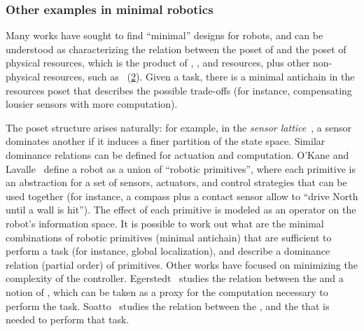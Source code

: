 \begin{figure}[h]
    \centering
    \caption{}
    \label{fig:dp_zia}
\end{figure}

\subsubsection{Other examples in minimal robotics}

Many works have sought to find ``minimal'' designs for robots, and can be understood as characterizing the relation between the poset of  and the poset of physical resources, which is the product of , , and  resources, plus other non-physical resources, such as ~(\cref{fig:robot-generic}).
Given a task, there is a minimal antichain in the resources poset that describes the possible trade-offs (for instance, compensating lousier sensors with more computation).



\begin{figure}
    \centering
    \caption{}
    \label{fig:robot-generic}
\end{figure}



The poset structure arises naturally: for example, in the \emph{sensor lattice}~\cite{lavalle12sensing}, a sensor dominates another if it induces a finer partition of the state space.
Similar dominance relations can be defined for actuation and computation.
O'Kane and
Lavalle~\cite{okane08comparing} define a robot as a union of ``robotic primitives'', where each primitive is an abstraction for a set of sensors, actuators, and control strategies that can be used together
(for instance, a compass plus a contact sensor allow to ``drive North until a wall is hit'').
The effect of each primitive is modeled as an operator on the robot's information space.
It is possible to work out what are the minimal combinations of robotic primitives (minimal antichain) that are sufficient to perform a task (for instance, global localization), and describe a dominance relation (partial order) of primitives.
Other works have focused on minimizing the complexity of the controller.
Egerstedt~\cite{egerstedt03motion} studies the relation between the  and a notion of , which can be taken as a proxy for the computation necessary to perform the task.
Soatto~\cite{soatto11steps}
studies the relation between the , and the  that is needed to perform that task.

